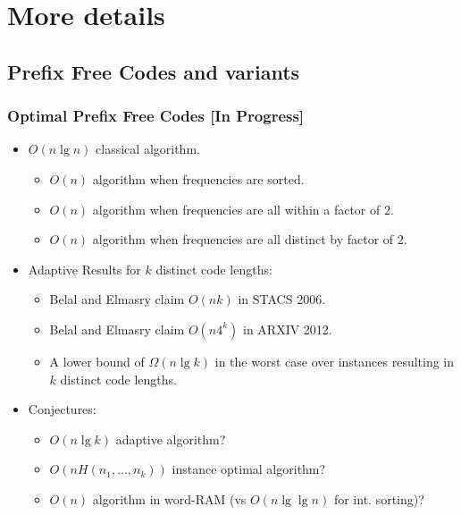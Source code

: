 \appendix

\section{More details}
\subsection{Prefix Free Codes and variants}

\begin{frame}
  \frametitle{Optimal Prefix Free Codes [In Progress]}
  \begin{itemize}
  \item $O(n\lg n)$ classical algorithm.
  \begin{itemize}
  \item $O(n)$ algorithm when frequencies are sorted.
  \item $O(n)$ algorithm when frequencies are all within a factor of $2$.
  \item $O(n)$ algorithm when frequencies are all distinct by factor of $2$.
    \end{itemize}
  \item Adaptive Results for $k$ distinct code lengths:
    \begin{itemize}
     \item Belal and Elmasry claim $O(nk)$ in STACS 2006. 
     \item Belal and Elmasry claim $O(n 4^k)$ in ARXIV 2012.
  \item A lower bound of \alert{$\Omega(n\lg k)$} in the worst case over
  instances resulting in $k$ distinct code lengths.
     \end{itemize}
\item Conjectures:
  \begin{itemize}
  \item $O(n\lg k)$ adaptive algorithm?
  \item $O(nH(n_1,\ldots,n_k))$ instance optimal algorithm?
  \item \alert{$O(n)$ algorithm in word-RAM} (vs $O(n\lg\lg n)$ for int. sorting)?
  \end{itemize}
  \end{itemize}
\end{frame}

